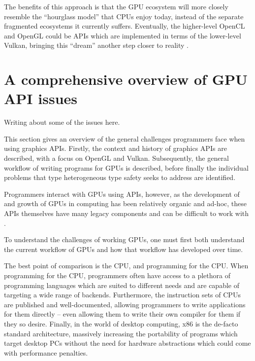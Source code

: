 \documentclass[a4paper,12pt,twoside,openright]{report}
\begin{document}
The benefits of this approach is that the GPU ecosystem will more closely
resemble the ``hourglass model'' that CPUs enjoy today, instead of the separate
fragmented ecosystems it currently suffers. Eventually, the higher-level OpenCL
and OpenGL could be APIs which are implemented in terms of the lower-level
Vulkan, bringing this ``dream'' another step closer to reality
\cite{OpenGLonVulkan} \cite{VulkanOpenCLMerge} \cite{OpenGLOverload}.






\appendix
\singlespacing

\chapter{A comprehensive overview of GPU API issues}

\label{app:other_API_issues}

Writing about some of the issues here.

This section gives an overview of the general challenges programmers face when
using graphics APIs. Firstly, the context and history of graphics APIs are
described, with a focus on OpenGL and Vulkan. Subsequently, the general
workflow of writing programs for GPUs is described, before finally the
individual problems that type heterogeneous type safety seeks to address are
identified.

Programmers interact with GPUs using APIs, however, as the development of and
growth of GPUs in computing has been relatively organic and ad-hoc, these APIs
themselves have many legacy components and can be difficult to work with
\cite{NVIDIAInternshipLessons}.


To understand the challenges of working GPUs, one must first both understand
the current workflow of GPUs and how that workflow has developed over time.

The best point of comparison is the CPU, and programming for the CPU. When
programming for the CPU, programmers often have access to a plethora of
programming languages which are suited to different needs and are capable of
targeting a wide range of backends. Furthermore, the instruction sets of CPUs
are published and well-documented, allowing programmers to write applications
for them directly -- even allowing them to write their own compiler for them
if they so desire. Finally, in the world of desktop computing, x86 is the
de-facto standard architecture, massively increasing the portability of
programs which target desktop PCs without the need for hardware abstractions
which could come with performance penalties.
\end{document}
